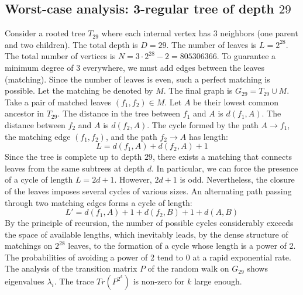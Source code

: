 \documentclass[11pt,a4paper]{article}
\begin{document}
\subsection{Worst-case analysis: 3-regular tree of depth $29$}
Consider a rooted tree $T_{29}$ where each internal vertex has 3 neighbors (one parent and two children).
The total depth is $D = 29$.
The number of leaves is $L = 2^{28}$.
The total number of vertices is $N = 3 \cdot 2^{28} - 2 = 805306366$.
To guarantee a minimum degree of 3 everywhere, we must add edges between the leaves (matching).
Since the number of leaves is even, such a perfect matching is possible.
Let the matching be denoted by $M$. The final graph is $G_{29} = T_{29} \cup M$.
Take a pair of matched leaves $(f_1, f_2) \in M$.
Let $A$ be their lowest common ancestor in $T_{29}$.
The distance in the tree between $f_1$ and $A$ is $d(f_1, A)$.
The distance between $f_2$ and $A$ is $d(f_2, A)$.
The cycle formed by the path $A \to f_1$, the matching edge $(f_1, f_2)$, and the path $f_2 \to A$ has length:
$$ L = d(f_1, A) + d(f_2, A) + 1 $$
Since the tree is complete up to depth $29$, there exists a matching that connects leaves from the same subtrees at depth $d$.
In particular, we can force the presence of a cycle of length $L = 2d + 1$. However, $2d+1$ is odd.
Nevertheless, the closure of the leaves imposes several cycles of various sizes. An alternating path passing through two matching edges forms a cycle of length:
$$ L' = d(f_1, A) + 1 + d(f_2, B) + 1 + d(A, B) $$
By the principle of recursion, the number of possible cycles considerably exceeds the space of available lengths, which inevitably leads, by the dense structure of matchings on $2^{28}$ leaves, to the formation of a cycle whose length is a power of 2. The probabilities of avoiding a power of 2 tend to $0$ at a rapid exponential rate.
The analysis of the transition matrix $P$ of the random walk on $G_{29}$ shows eigenvalues $\lambda_i$. The trace $Tr(P^{2^k})$ is non-zero for $k$ large enough.
\end{document}
